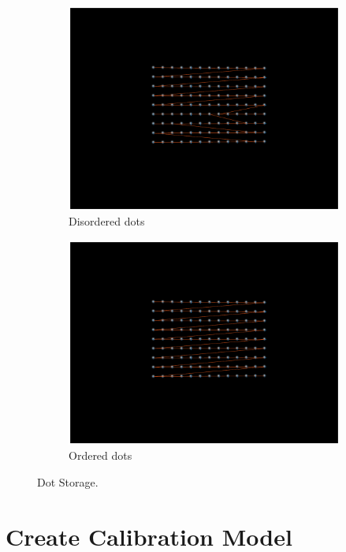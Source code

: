 \begin{figure}[h!]
	\centering
	\begin{subfigure}[t]{0.48\linewidth}
		\centering
		\includegraphics[width=1\linewidth]{figures/part2/dot_disorder.eps}
		\caption{Disordered dots}
		\label{fig:dot_disorder}
	\end{subfigure}
	\begin{subfigure}[t]{0.48\linewidth}
		\centering
		\includegraphics[width=1\linewidth]{figures/part2/dot_ordered.eps}
		\caption{Ordered dots}
		\label{fig:dot_ordered}
	\end{subfigure}
	\caption{Dot Storage.}
\end{figure}


\section{Create Calibration Model}

